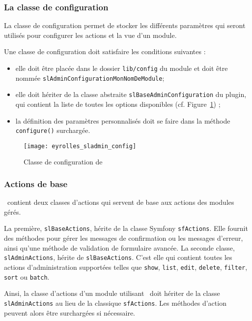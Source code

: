 \subsubsection{La classe de configuration}

La classe de configuration permet de stocker les différents paramètres qui seront utilisés pour configurer les actions et la vue d'un module.

Une classe de configuration doit satisfaire les conditions suivantes :
\begin{itemize}
	\item elle doit être placée dans le dossier \texttt{lib/config} du module et doit être nommée \texttt{slAdminConfigurationMonNomDeModule};
	\item elle doit hériter de la classe abstraite \texttt{slBaseAdminConfiguration} du plugin, qui contient la liste de toutes les options disponibles (cf. Figure~\ref{figure:eyrolles_sladmin_config}) ;
	\item la définition des paramètres personnalisés doit se faire dans la méthode \texttt{configure()} surchargée.
\end{itemize}

\begin{figure}
	\centering
	\texttt{[image: eyrolles\_sladmin\_config]}
	\caption{Classe de configuration de \asladmin}
	\label{figure:eyrolles_sladmin_config}
\end{figure}


\subsubsection{Actions de base}

\asladmin\ contient deux classes d'actions qui servent de base aux actions des modules gérés.

La première, \texttt{slBaseActions}, hérite de la classe Symfony \texttt{sfActions}. Elle fournit des méthodes pour gérer les messages de confirmation ou les messages d'erreur, ainsi qu'une méthode de validation de formulaire avancée. La seconde classe, \texttt{slAdminActions}, hérite de \texttt{slBaseActions}. C'est elle qui contient toutes les actions d'administration supportées telles que \texttt{show}, \texttt{list}, \texttt{edit}, \texttt{delete}, \texttt{filter}, \texttt{sort} ou \texttt{batch}.

Ainsi, la classe d'actions d'un module utilisant \asladmin\ doit hériter de la classe \texttt{slAdminActions} au lieu de la classique \texttt{sfActions}. Les méthodes d'action peuvent alors être surchargées si nécessaire.

